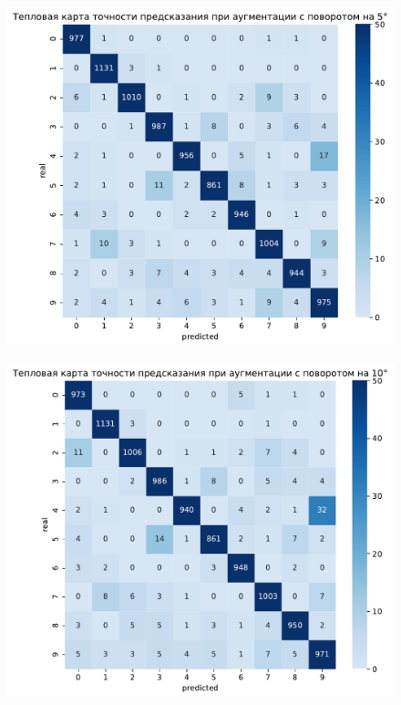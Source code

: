 \documentclass{article}
\begin{document}
\begin{figure}[H]	
	\subfigure
	{
	    \begin{minipage}{8cm}
            \centering
            \includegraphics[scale=0.35]{TASK1 warm map rotated5.pdf}
        \end{minipage}
        \label{app:rot5}
	}
	\subfigure
	{
		\begin{minipage}{8cm}
			\centering
			\includegraphics[scale=0.35]{TASK1 warm map rotated10.pdf}

\end{minipage}}
\end{figure}
\end{document}
